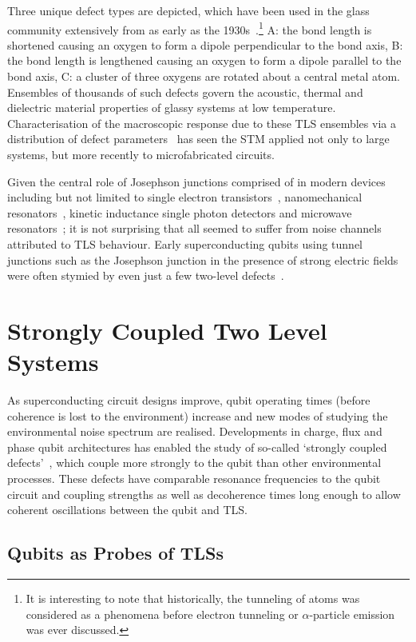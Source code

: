 Three unique defect types are depicted, which have been used in the glass community extensively from as early as the 1930s~\cite{Zachariasen1932}.\footnote{It is interesting to note that historically, the tunneling of atoms was considered as a phenomena before electron tunneling or $\alpha$-particle emission was ever discussed.}
A: the bond length is shortened causing an oxygen to form a dipole perpendicular to the bond axis, B: the bond length is lengthened causing an oxygen to form a dipole parallel to the bond axis, C: a cluster of three oxygens are rotated about a central metal atom.
Ensembles of thousands of such defects govern the acoustic, thermal and dielectric material properties of glassy systems at low temperature.
Characterisation of the macroscopic response due to these TLS ensembles via a distribution of defect parameters~\cite{Enss2005} has seen the STM applied not only to large systems, but more recently to microfabricated circuits.

Given the central role of Josephson junctions comprised of  in modern
devices including but not limited to single electron transistors~\cite{Zimmerli1992}, nanomechanical resonators~\cite{Ahn2003}, kinetic inductance single photon detectors and microwave resonators~\cite{Gao2007}; it is not surprising that all seemed to suffer from noise channels attributed to TLS behaviour.
Early superconducting qubits using tunnel junctions such as the Josephson junction in the presence of strong electric fields were often stymied by even just a few two-level defects~\cite{Simmonds2004}.

\section{Strongly Coupled Two Level Systems}

As superconducting circuit designs improve, qubit operating times (before coherence is lost to the environment) increase and new modes of studying the environmental noise spectrum are realised.
Developments in charge, flux and phase qubit architectures has enabled the study of so-called `strongly coupled defects'~\cite{Neeley2008, Lupascu2009, Lisenfeld2010}, which couple more strongly to the qubit than other environmental processes.
These defects have comparable resonance frequencies to the qubit circuit and coupling strengths as well as decoherence times long enough to allow coherent oscillations between the qubit and TLS.

\subsection{Qubits as Probes of TLSs}\label{sec:probes}

